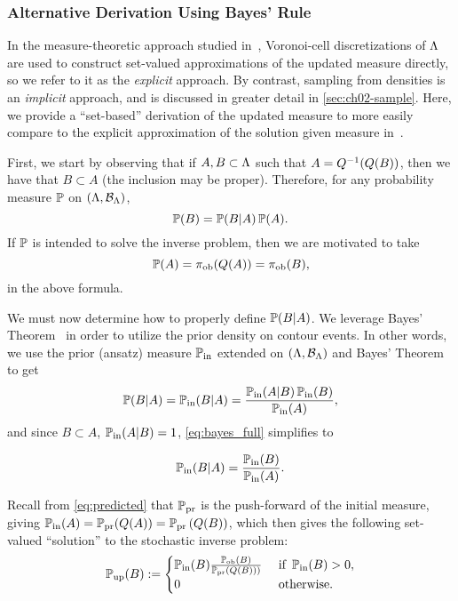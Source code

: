 \subsubsection{Alternative Derivation Using Bayes' Rule}\label{sec:set_bayes}
In the measure-theoretic approach studied in~\cite{BBE11, BET+14}, Voronoi-cell discretizations of ${\Lambda}$ are used to construct set-valued approximations of the updated measure directly, so we refer to it as the \emph{explicit} approach.
By contrast, sampling from densities is an \emph{implicit} approach, and is discussed in greater detail in \ref{sec:ch02-sample}.
Here, we provide a ``set-based'' derivation of the updated measure to more easily compare to the explicit approximation of the solution given measure in~\cite{BET+14}.

First, we start by observing that if $A, B \subset {\Lambda}$ such that $A = Q^{-1}(Q(B))$, then we have that $B\subset A$ (the inclusion may be proper).
Therefore, for any probability measure $\mathbb{P}$ on $({\Lambda}, \mathcal{B}_{{\Lambda}})$,
\[
\mathbb{P}(B) = \mathbb{P}(B|A) \, \mathbb{P}(A).
\]
If $\mathbb{P}$ is intended to solve the inverse problem, then we are motivated to take
\[
\mathbb{P}(A) = \operatorname*{\pi_{ob}} (Q(A)) = \operatorname*{\pi_{ob}} (B),
\]
in the above formula.

We must now determine how to properly define $\mathbb{P}(B|A)$.
We leverage Bayes' Theorem~\cite{Smith} in order to utilize the prior density on contour events.
In other words, we use the prior (ansatz) measure $\operatorname*{\mathbb{P}_{in}}$ extended on $({\Lambda}, \mathcal{B}_{{\Lambda}})$ and Bayes' Theorem to get
\begin{equation}\label{eq:bayes_full}
\mathbb{P}(B|A) = \operatorname*{\mathbb{P}_{in}}(B|A) = \frac{ \operatorname*{\mathbb{P}_{in}}(A|B) \operatorname*{\mathbb{P}_{in}}(B) }{ \operatorname*{\mathbb{P}_{in}}(A) },
\end{equation}
and since $B \subset A$, $\operatorname*{\mathbb{P}_{in}}(A|B) = 1$, \eqref{eq:bayes_full} simplifies to

\begin{equation}\label{eq:bayes}
\operatorname*{\mathbb{P}_{in}}(B|A) = \frac{ \operatorname*{\mathbb{P}_{in}}(B) }{ \operatorname*{\mathbb{P}_{in}}(A) }.
\end{equation}

Recall from \eqref{eq:predicted} that $\operatorname*{\mathbb{P}_{pr}}$ is the push-forward of the initial measure, giving $\operatorname*{\mathbb{P}_{in}}(A) = \operatorname*{\mathbb{P}_{pr}} (Q(A)) = \operatorname*{\mathbb{P}_{pr}} \left (Q(B)\right )$, which then gives the following set-valued ``solution'' to the stochastic inverse problem:
\begin{equation}\label{eq:sip_sol_cont}
\operatorname*{\mathbb{P}_{up}}(B) := \begin{cases}
\operatorname*{\mathbb{P}_{in}}(B) \frac{ \operatorname*{\mathbb{P}_{ob}}(B) }{ \operatorname*{\mathbb{P}_{pr}} \left (Q(B)\right ) ) } & \text{ if } \operatorname*{\mathbb{P}_{in}}(B) > 0,\\
0 & \text{ otherwise}.
\end{cases}
\end{equation}

